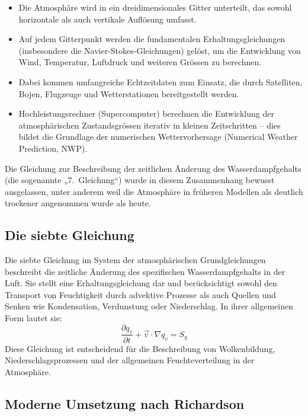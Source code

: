 \begin{itemize}
    \item Die Atmosphäre wird in ein dreidimensionales Gitter unterteilt, das sowohl horizontale als auch vertikale Auflösung umfasst.
    \item Auf jedem Gitterpunkt werden die fundamentalen Erhaltungsgleichungen (insbesondere die Navier-Stokes-Gleichungen) gelöst, um die Entwicklung von Wind, Temperatur, Luftdruck und weiteren Grössen zu berechnen.
    \item Dabei kommen umfangreiche Echtzeitdaten zum Einsatz, die durch Satelliten, Bojen, Flugzeuge und Wetterstationen bereitgestellt werden.
    \item Hochleistungsrechner (Supercomputer) berechnen die Entwicklung der atmosphärischen Zustandsgrössen iterativ in kleinen Zeitschritten – dies bildet die Grundlage der numerischen Wettervorhersage (Numerical Weather Prediction, NWP).
\end{itemize}

Die Gleichung zur Beschreibung der zeitlichen Änderung des Wasserdampfgehalts (die sogenannte „7.~Gleichung“) wurde in diesem Zusammenhang bewusst ausgelassen, unter anderem weil die Atmosphäre in früheren Modellen als deutlich trockener angenommen wurde als heute.

\subsection{Die siebte Gleichung}

Die siebte Gleichung im System der atmosphärischen Grundgleichungen beschreibt die zeitliche Änderung des spezifischen Wasserdampfgehalts in der Luft. Sie stellt eine Erhaltungsgleichung dar und berücksichtigt sowohl den Transport von Feuchtigkeit durch advektive Prozesse als auch Quellen und Senken wie Kondensation, Verdunstung oder Niederschlag.
In ihrer allgemeinen Form lautet sie:
\begin{equation}
\frac{\partial q_v}{\partial t} + \vec{v} \cdot \nabla q_v = S_q
\label{geostrophisch:equation6}
\end{equation}
Diese Gleichung ist entscheidend für die Beschreibung von Wolkenbildung, Niederschlagsprozessen und der allgemeinen Feuchteverteilung in der Atmosphäre.

\subsection{Moderne Umsetzung nach Richardson} 

